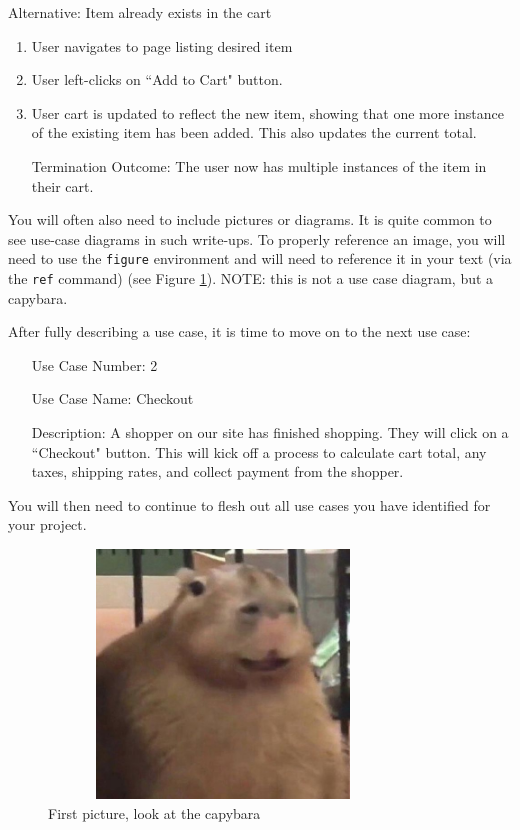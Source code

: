 \documentclass[10pt,conference,onecolumn,compsoc]{IEEEtran}
\begin{document}
Alternative: Item already exists in the cart
\begin{enumerate}
\item User navigates to page listing desired item
\item User left-clicks on ``Add to Cart" button.
\item User cart is updated to reflect the new item, showing that one more instance of the existing item has been added.  This also updates the current total.
\item[Termination Outcome:] The user now has multiple instances of the item in their cart.
\end{enumerate}

You will often also need to include pictures or diagrams.  It is quite common to see use-case diagrams in such write-ups.  To properly reference an image, you will need to use the \texttt{figure} environment and will need to reference it in your text (via the \texttt{ref} command) (see Figure \ref{capybara1}).  NOTE: this is not a use case diagram, but a capybara.

After fully describing a use case, it is time to move on to the next use case:

\begin{itemize}
\item[Use Case Number:] 2
\item[Use Case Name:] Checkout
\item[Description:] A shopper on our site has finished shopping.  They will click on a ``Checkout" button.  This will kick off a process to calculate cart total, any taxes, shipping rates, and collect payment from the shopper.

\end{itemize}

You will then need to continue to flesh out all use cases you have identified for your project.

\begin{figure}[ht!]
\includegraphics[height=250px, width=350px]{capybara1.jpg}
\caption{First picture, look at the capybara}
\label{capybara1}
\end{figure}
\end{document}
